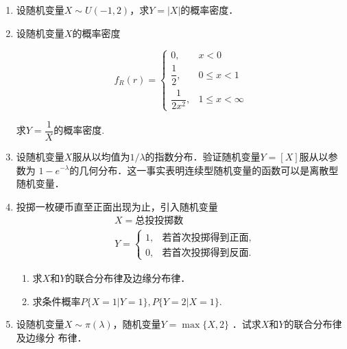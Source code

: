 \documentclass[10pt,a4paper]{article}
\begin{document}
\begin{enumerate}
    \item 设随机变量$X\sim U(-1,2)$，求$Y=|X|$的概率密度．
    


    \item 设随机变量$X$的概率密度

    \vspace{-0.5cm}
    \begin{spacing}{2}
    $$f_R(r)=\left\{\begin{array}{ll}
        0, & x<0\\
        \dfrac{1}{2}, & 0\leq x <1\\
        \dfrac{1}{2x^2}, & 1\leq x <\infty
    \end{array}\right.$$
    \end{spacing}
    求$Y=\dfrac{1}{X}$的概率密度.



    \item 设随机变量$X$服从以均值为$1/\lambda$的指数分布．验证随机变量$Y=[X]$服从以参数为
    $1-e^{-\lambda}$的几何分布．这一事实表明连续型随机变量的函数可以是离散型随机变量．





    \item 投掷一枚硬币直至正面出现为止，引入随机变量
    \begin{equation}
        \begin{split}
            &X=\mbox{总投投掷数}\\
            &Y=\left\{\begin{array}{ll}
                1, & \mbox{若首次投掷得到正面},\\
                0, & \mbox{若首次投掷得到反面}.
            \end{array}\right.
        \end{split}
        \nonumber
    \end{equation}
    \begin{enumerate}
        \item 求$X$和$Y$的联合分布律及边缘分布律．
        \item 求条件概率$P\{X=1|Y=1\},P\{Y=2|X=1\}$.
    \end{enumerate}
        


    
    \item 设随机变量$X\sim \pi(\lambda)$，随机变量$Y=\max\{X,2\}$ ．试求$X$和$Y$的联合分布律及边缘分
    布律．





\end{enumerate}
\end{document}
